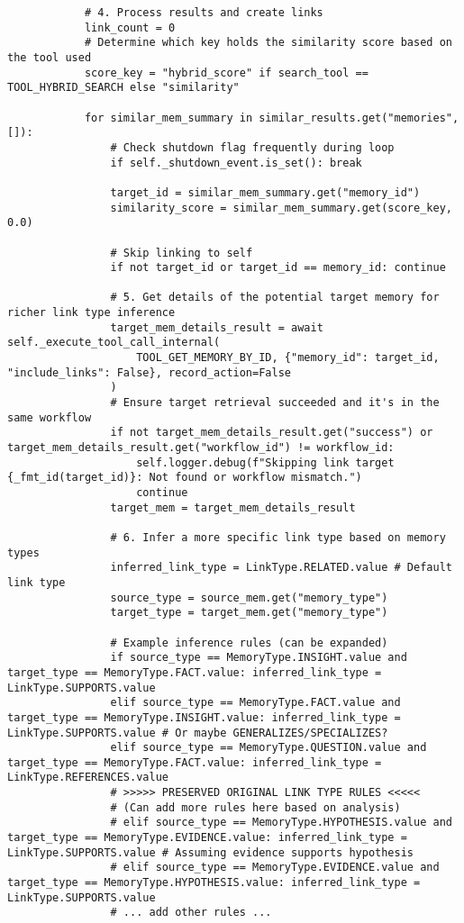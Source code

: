 \documentclass[12pt,a4paper]{article}
\begin{document}
\begin{pageablecode}
\begin{verbatim}
            # 4. Process results and create links
            link_count = 0
            # Determine which key holds the similarity score based on the tool used
            score_key = "hybrid_score" if search_tool == TOOL_HYBRID_SEARCH else "similarity"

            for similar_mem_summary in similar_results.get("memories", []):
                # Check shutdown flag frequently during loop
                if self._shutdown_event.is_set(): break

                target_id = similar_mem_summary.get("memory_id")
                similarity_score = similar_mem_summary.get(score_key, 0.0)

                # Skip linking to self
                if not target_id or target_id == memory_id: continue

                # 5. Get details of the potential target memory for richer link type inference
                target_mem_details_result = await self._execute_tool_call_internal(
                    TOOL_GET_MEMORY_BY_ID, {"memory_id": target_id, "include_links": False}, record_action=False
                )
                # Ensure target retrieval succeeded and it's in the same workflow
                if not target_mem_details_result.get("success") or target_mem_details_result.get("workflow_id") != workflow_id:
                    self.logger.debug(f"Skipping link target {_fmt_id(target_id)}: Not found or workflow mismatch.")
                    continue
                target_mem = target_mem_details_result

                # 6. Infer a more specific link type based on memory types
                inferred_link_type = LinkType.RELATED.value # Default link type
                source_type = source_mem.get("memory_type")
                target_type = target_mem.get("memory_type")

                # Example inference rules (can be expanded)
                if source_type == MemoryType.INSIGHT.value and target_type == MemoryType.FACT.value: inferred_link_type = LinkType.SUPPORTS.value
                elif source_type == MemoryType.FACT.value and target_type == MemoryType.INSIGHT.value: inferred_link_type = LinkType.SUPPORTS.value # Or maybe GENERALIZES/SPECIALIZES?
                elif source_type == MemoryType.QUESTION.value and target_type == MemoryType.FACT.value: inferred_link_type = LinkType.REFERENCES.value
                # >>>>> PRESERVED ORIGINAL LINK TYPE RULES <<<<<
                # (Can add more rules here based on analysis)
                # elif source_type == MemoryType.HYPOTHESIS.value and target_type == MemoryType.EVIDENCE.value: inferred_link_type = LinkType.SUPPORTS.value # Assuming evidence supports hypothesis
                # elif source_type == MemoryType.EVIDENCE.value and target_type == MemoryType.HYPOTHESIS.value: inferred_link_type = LinkType.SUPPORTS.value
                # ... add other rules ...


\end{verbatim}
\end{pageablecode}
\end{document}

